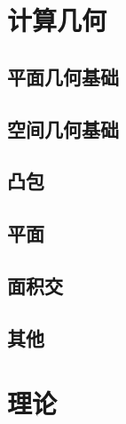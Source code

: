 \documentclass[12pt,a4paper,titlepage]{article}
\begin{document}
\section{\LARGE 计算几何}
	\subsection{平面几何基础}
    
    
    
    

	\subsection{空间几何基础}
    
    

	\subsection{凸包}
	
	
	
	
	

	\subsection{平面}
	
	
	
	
	
	

	\subsection{面积交}
	
	
	
	
	

	\subsection{其他}
    

\section{\LARGE 理论}
\end{document}
